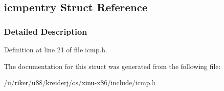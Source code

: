 \hypertarget{structicmpentry}{}\subsection{icmpentry Struct Reference}
\label{structicmpentry}


\subsubsection{Detailed Description}


Definition at line 21 of file icmp.\+h.



The documentation for this struct was generated from the following file\+:\begin{DoxyCompactItemize}
\item 
/u/riker/u88/kreiderj/os/xinu-\/x86/include/icmp.\+h\end{DoxyCompactItemize}
